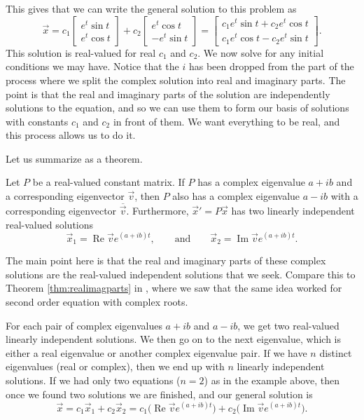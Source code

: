 \documentclass{ximera}
\begin{document}
This gives that we can write the general solution to this problem as
\begin{equation*}
    \vec{x} = c_1
    \begin{bmatrix}
        e^t \sin t  \\
        e^t \cos t
    \end{bmatrix} 
    + c_2
    \begin{bmatrix}
        e^t \cos t \\
        -e^t \sin t
    \end{bmatrix} 
    =
    \begin{bmatrix}
        c_1 e^t \sin t + c_2 e^t \cos t \\
        c_1 e^t \cos t - c_2 e^t \sin t
    \end{bmatrix} .
\end{equation*}
This solution is real-valued for real $c_1$ and $c_2$.  We now solve for any initial conditions we may have. Notice that the $i$ has been dropped from the part of the process where we split the complex solution into real and imaginary parts. The point is that the real and imaginary parts of the solution are independently solutions to the equation, and so we can use them to form our basis of solutions with constants $c_1$ and $c_2$ in front of them. We want everything to be real, and this process allows us to do it.

Let us summarize as a theorem. 

\begin{theorem}{}
    Let $P$ be a real-valued constant matrix. If $P$ has a complex eigenvalue $a+ib$ and a corresponding eigenvector $\vec{v}$, then $P$ also has a complex eigenvalue $a-ib$ with a corresponding eigenvector $\overline{\vec{v}}$. Furthermore, ${\vec{x}}' = P\vec{x}$ has two linearly independent real-valued solutions
    \begin{equation*}
        \vec{x}_1 = \operatorname{Re} \vec{v} e^{(a+ib)t} ,
        \qquad \text{and} \qquad
        \vec{x}_2 = \operatorname{Im} \vec{v} e^{(a+ib)t} .
    \end{equation*}
\end{theorem}

The main point here is that the real and imaginary parts of these complex solutions are the real-valued independent solutions that we seek. Compare this to Theorem \ref{thm:realimagparts} in , where we saw that the same idea worked for second order equation with complex roots.

For each pair of complex eigenvalues $a+ib$ and $a-ib$, we get two real-valued linearly independent solutions. We then go on to the next eigenvalue, which is either a real eigenvalue or another complex eigenvalue pair.  If we have $n$ distinct eigenvalues (real or complex), then we end up with $n$ linearly independent solutions. If we had only two equations ($n=2$) as in the example above, then once we found two solutions we are finished, and our general solution is
\begin{equation*}
    \vec{x} = c_1 \vec{x}_1 + c_2 \vec{x}_2 = c_1 \bigl( \operatorname{Re} \vec{v} e^{(a+ib)t} \bigr) + c_2 \bigl( \operatorname{Im} \vec{v} e^{(a+ib)t} \bigr).
\end{equation*}
\end{document}
